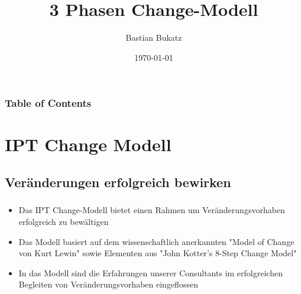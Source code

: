 \documentclass[aspectratio=169]{beamer}
\title{3 Phasen Change-Modell}
\subtitle{\fontsize{40}{40}\color{ice-blue}\SnowflakeChevron\raisebox{0.3cm}{\color{ipt-red}\selectfont~$\approx$~}\raisebox{0.2cm}{\selectfont\color{ipt-blue}\#}}
\author{Bastian Bukatz}
\institute{Innovation Process Technology}
\date{\today}
\begin{document}
\begin{frame}
\titlepage
\end{frame}


\begin{frame}
\frametitle{Table of Contents}
\tableofcontents
\end{frame}


\section{IPT Change Modell}
\subsection{Veränderungen erfolgreich bewirken}
\begin{frame}
\frametitle{\secname}\framesubtitle{\subsecname}
\begin{itemize}[label={$\bullet$}]
\item Das IPT Change-Modell bietet einen Rahmen um Veränderungsvorhaben erfolgreich zu bewältigen
\item Das Modell basiert auf dem wissenschaftlich anerkannten "Model of Change von Kurt Lewin" sowie Elementen aus "John Kotter's 8-Step Change Model"
\item In das Modell sind die Erfahrungen unserer Consultants im erfolgreichen Begleiten von Veränderungsvorhaben eingeflossen
\end{itemize}
\end{frame}
\end{document}
